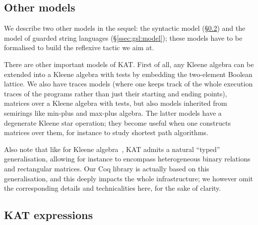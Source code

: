 \documentclass[a4paper]{llncs}
\newif\iflong\longfalse
\begin{document}
\subsection{Other models}
\label{ssec:other:models}

We describe two other models in the sequel: the syntactic model
(§\ref{ssec:syntactic:model}) and the model of guarded string
languages (§\ref{ssec:gsl:model}); these models have to be formalised
to build the reflexive tactic we aim at. 

There are other important models of KAT. First of all, any Kleene
algebra can be extended into a Kleene algebra with tests by embedding
the two-element Boolean lattice. We also have traces models (where one
keeps track of the whole execution traces of the programs rather than
just their starting and ending points), matrices over a Kleene algebra
with tests, but also models inherited from semirings like min-plus and
max-plus algebra\iflong, or convex-polygon semirings~\cite{IwanoS90}\fi. The latter
models have a degenerate Kleene star operation; they become useful
when one constructs matrices over them, for instance to study shortest
path algorithms.

Also note that like for Kleene
algebra~\cite{kozen98:ka:typed,pous:csl10:utas,bp:itp10:kacoq}, KAT
admits a natural ``typed'' generalisation, allowing for instance to
encompass heterogeneous binary relations and rectangular matrices. Our
Coq library is actually based on this generalisation, and this deeply
impacts the whole infrastructure; we however omit the corresponding
details and technicalities here, for the sake of clarity.




\subsection{KAT expressions}
\label{ssec:syntactic:model}
\end{document}

